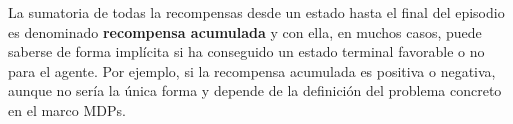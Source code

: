 \documentclass[11pt,fleqn]{book} %
\begin{document}
La sumatoria de todas la recompensas desde un estado hasta el final del episodio es denominado \textbf{recompensa acumulada} y con ella, en muchos casos, puede saberse de forma implícita si ha conseguido un estado terminal favorable o no para el agente. Por ejemplo, si la recompensa acumulada es positiva o negativa, aunque no sería la única forma y depende de la definición del problema concreto en el marco MDPs. \\

%
%
%
\end{document}
